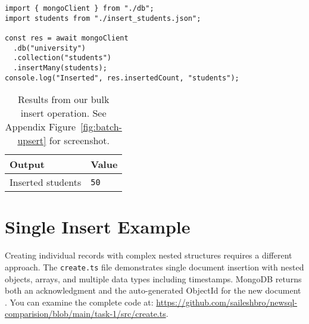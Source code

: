 \begin{verbatim}
import { mongoClient } from "./db";
import students from "./insert_students.json";

const res = await mongoClient
  .db("university")
  .collection("students")
  .insertMany(students);
console.log("Inserted", res.insertedCount, "students");
\end{verbatim}

\begin{table}[H]
  \centering
  \begin{tabular}{|l|l|}
    \hline
    \textbf{Output} & \textbf{Value} \\
    \hline
    Inserted students & \texttt{50} \\
    \hline
  \end{tabular}
  \caption{Results from our bulk insert operation. See Appendix Figure~\ref{fig:batch-upsert} for screenshot.}
\end{table}

\section{Single Insert Example}
Creating individual records with complex nested structures requires a different approach. The \texttt{create.ts} file demonstrates single document insertion with nested objects, arrays, and multiple data types including timestamps. MongoDB returns both an acknowledgment and the auto-generated ObjectId for the new document \parencite{mongodb_definitive_guide}. You can examine the complete code at: \url{https://github.com/saileshbro/newsql-comparision/blob/main/task-1/src/create.ts}.

